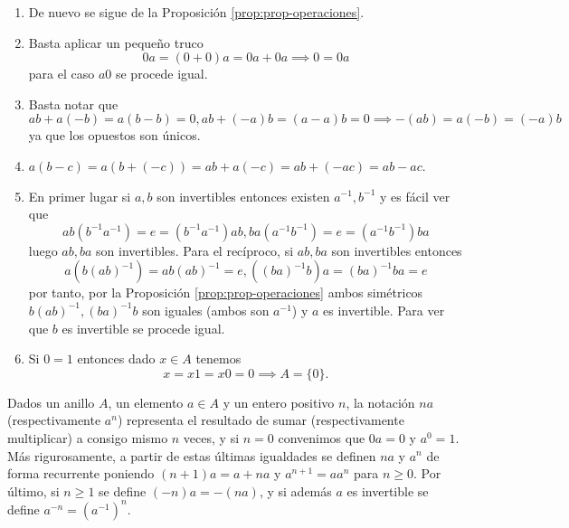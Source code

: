 {\begin{enumerate}
        \item De nuevo se sigue de la Proposición \ref{prop:prop-operaciones}.
        \item Basta aplicar un pequeño truco
        \[
        0a=(0+0)a = 0a + 0a \implies 0 = 0a
        \]
        para el caso $a0$ se procede igual.
        \item Basta notar que
        \[
        ab + a(-b) = a(b-b) = 0, ab + (-a)b = (a-a)b = 0 \implies -(ab)=a(-b) = (-a)b 
        \]
        ya que los opuestos son únicos.
        \item $a(b-c)=a(b+(-c))=ab+a(-c)=ab+(-ac)=ab-ac$.
        \item En primer lugar si $a,b$ son invertibles entonces existen $a^{-1},b^{-1}$ y es fácil ver que
        \[
        ab(b^{-1}a^{-1})=e=(b^{-1}a^{-1})ab, ba(a^{-1}b^{-1})=e=(a^{-1}b^{-1})ba
        \]
        luego $ab,ba$ son invertibles. Para el recíproco, si $ab,ba$ son invertibles entonces
        \[
        a(b(ab)^{-1})=ab(ab)^{-1}=e, ((ba)^{-1}b)a=(ba)^{-1}ba=e
        \]
        por tanto, por la Proposición \ref{prop:prop-operaciones} ambos simétricos $b(ab)^{-1},(ba)^{-1}b$ son iguales (ambos son $a^{-1}$) y $a$ es invertible. Para ver que $b$ es invertible se procede igual.
        \item Si $0=1$ entonces dado $x \in A$ tenemos
        \[
        x = x1 = x0 = 0 \implies A=\{0\}.
        \]
    \end{enumerate}
}

Dados un anillo $A$, un elemento $a \in A$ y un entero positivo $n$, la notación $na$ (respectivamente $a^n$) representa el resultado de sumar (respectivamente multiplicar) a consigo mismo $n$ veces, y si $n = 0$ convenimos que $0a = 0$ y $a^0 = 1$. Más rigurosamente, a partir de estas últimas igualdades se definen $na$ y $a^n$ de forma recurrente poniendo $(n + 1)a = a + na$ y $a^{n+1} = aa^n$ para $n \geq 0$. Por último, si $n \geq 1$ se define $(-n)a = -(na)$, y si además $a$ es invertible se define $a^{-n} = (a^{-1})^n$.

